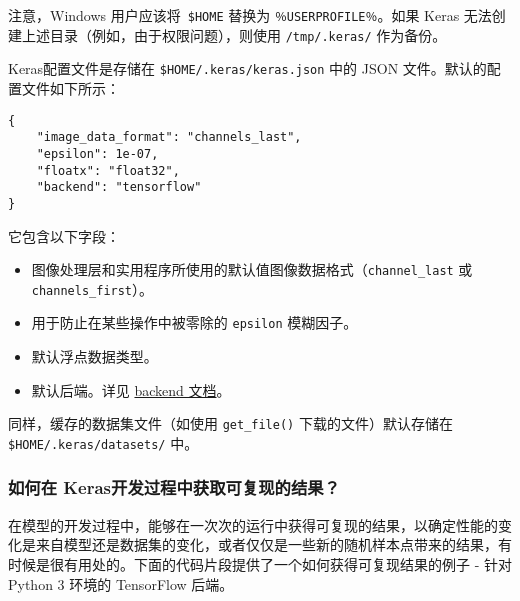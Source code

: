 \begin{Shaded}
\begin{Highlighting}[]
\end{Highlighting}
\end{Shaded}

注意，Windows 用户应该将~\texttt{\$HOME} 替换为
\texttt{％USERPROFILE％}。如果 Keras
无法创建上述目录（例如，由于权限问题），则使用 \texttt{/tmp/.keras/}
作为备份。

Keras配置文件是存储在 \texttt{\$HOME/.keras/keras.json} 中的 JSON
文件。默认的配置文件如下所示：

\begin{verbatim}
{
    "image_data_format": "channels_last",
    "epsilon": 1e-07,
    "floatx": "float32",
    "backend": "tensorflow"
}
\end{verbatim}

它包含以下字段：

\begin{itemize}
\tightlist
\item
  图像处理层和实用程序所使用的默认值图像数据格式（\texttt{channel\_last}
  或 \texttt{channels\_first}）。
\item
  用于防止在某些操作中被零除的 \texttt{epsilon} 模糊因子。
\item
  默认浮点数据类型。
\item
  默认后端。详见 \hyperref[keras-backend]{backend 文档}。
\end{itemize}

同样，缓存的数据集文件（如使用 \texttt{get\_file()}
下载的文件）默认存储在 \texttt{\$HOME/.keras/datasets/} 中。



\subsubsection{如何在 Keras开发过程中获取可复现的结果？}\label{how-can-i-obtain-reproducible-results-using-keras-during-development}

在模型的开发过程中，能够在一次次的运行中获得可复现的结果，以确定性能的变化是来自模型还是数据集的变化，或者仅仅是一些新的随机样本点带来的结果，有时候是很有用处的。下面的代码片段提供了一个如何获得可复现结果的例子
- 针对 Python 3 环境的 TensorFlow 后端。

